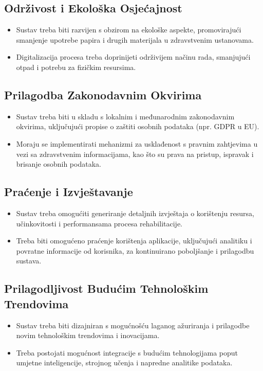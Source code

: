 \subsection*{Održivost i Ekološka Osjećajnost}
\begin{itemize}
    \item Sustav treba biti razvijen s obzirom na ekološke aspekte, promovirajući smanjenje upotrebe papira i drugih materijala u zdravstvenim ustanovama.
    \item Digitalizacija procesa treba doprinijeti održivijem načinu rada, smanjujući otpad i potrebu za fizičkim resursima.
\end{itemize}

\subsection*{Prilagodba Zakonodavnim Okvirima}
\begin{itemize}
    \item Sustav treba biti u skladu s lokalnim i međunarodnim zakonodavnim okvirima, uključujući propise o zaštiti osobnih podataka (npr. GDPR u EU).
    \item Moraju se implementirati mehanizmi za usklađenost s pravnim zahtjevima u vezi sa zdravstvenim informacijama, kao što su prava na pristup, ispravak i brisanje osobnih podataka.
\end{itemize}

\subsection*{Praćenje i Izvještavanje}
\begin{itemize}
    \item Sustav treba omogućiti generiranje detaljnih izvještaja o korištenju resursa, učinkovitosti i performansama procesa rehabilitacije.
    \item Treba biti omogućeno praćenje korištenja aplikacije, uključujući analitiku i povratne informacije od korisnika, za kontinuirano poboljšanje i prilagodbu sustava.
\end{itemize}

\subsection*{Prilagodljivost Budućim Tehnološkim Trendovima}
\begin{itemize}
    \item Sustav treba biti dizajniran s mogućnošću laganog ažuriranja i prilagodbe novim tehnološkim trendovima i inovacijama.
    \item Treba postojati mogućnost integracije s budućim tehnologijama poput umjetne inteligencije, strojnog učenja i napredne analitike podataka.
\end{itemize}


\eject
